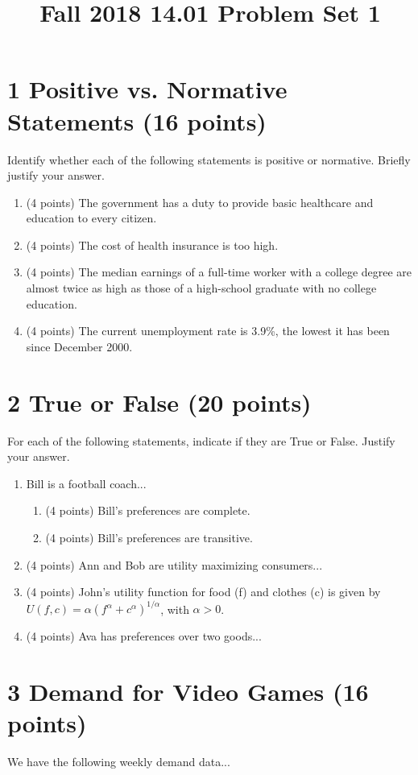 \documentclass[12pt]{article}
\title{Fall 2018 14.01 Problem Set 1}
\date{}
\begin{document}
\maketitle
\noindent
\section*{1 Positive vs. Normative Statements (16 points)}
Identify whether each of the following statements is positive or normative. Briefly\\ 
justify your answer.
\begin{enumerate}
\item (4 points) The government has a duty to provide basic healthcare and education to every citizen.
\item (4 points) The cost of health insurance is too high.
\item (4 points) The median earnings of a full-time worker with a college degree are almost twice as high as those of a high-school graduate with no college education.
\item (4 points) The current unemployment rate is 3.9\%, the lowest it has been since December 2000.
\end{enumerate}

\section*{2 True or False (20 points)}
For each of the following statements, indicate if they are True or False. Justify your answer.
\begin{enumerate}
\item Bill is a football coach...
    \begin{enumerate}
    \item (4 points) Bill’s preferences are complete.
    \item (4 points) Bill’s preferences are transitive.
    \end{enumerate}
\item (4 points) Ann and Bob are utility maximizing consumers...
\item (4 points) John’s utility function for food (f) and clothes (c) is given by $U (f, c) = \alpha (f^\alpha + c^\alpha)^{1/\alpha}$, with $\alpha > 0$. 
\item (4 points) Ava has preferences over two goods...
\end{enumerate}

\section*{3 Demand for Video Games (16 points)}
We have the following weekly demand data...
\end{document}
